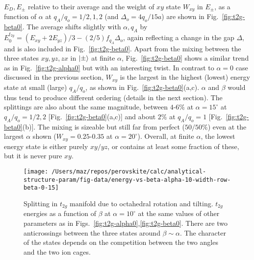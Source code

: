 \documentclass[a4paper,prb,twocolumn]{revtex4-1}  %
\begin{document}
$E_D, E_{\pm}$ relative to their average
and the weight of $xy$ state $W_{xy}$ in $E_{\pm}$,
as a function of $\alpha$ at $q_A/q_o=1/2,1,2$ (and $\Delta_o=4q_o/15a$)
are shown in Fig.~\ref{fig:t2g-beta0}.
The average shifts slightly with $\alpha,q_A$ by 
$E_0^{t_{2g}}= \left(E_{xy} + 2 E_{yz}\right)/3-(2/5)f_{q_A}\Delta_{o}$,
again reflecting 
a change in the gap $\Delta$,
and is also included in Fig.~\ref{fig:t2g-beta0}.
Apart from the mixing between the three states $xy,yz,zx$ in $\ket{\pm}$ at finite $\alpha$, 
Fig.~\ref{fig:t2g-beta0} shows a similar trend as in Fig.~\ref{fig:t2g-alpha0}
but with an interesting twist.
In contrast to $\alpha=0$ case discussed in the previous section,
$W_{xy}$ is the largest in the highest (lowest) energy state at small (large) $q_A/q_o$,
as shown in Fig.~\ref{fig:t2g-beta0}(a,c).
$\alpha$ and $\beta$ would thus tend to produce different ordering
(details in the next section).
The splittings are also about the same magnitude, between $4$-$6\%$ at $\alpha=15^\circ$
at $q_A/q_o=1/2,2$ [Fig.~\ref{fig:t2g-beta0}(a,c)] and about $2\%$ at $q_A/q_o=1$ [Fig.~\ref{fig:t2g-beta0}(b)].
The mixing is sizeable but still far from perfect ($50/50\%$) even at the largest $\alpha$ shown ($W_{xy}=0.25$-$0.35$ at $\alpha=20^\circ$).
Overall, at finite $\alpha$,
the lowest energy state is either purely $xy/yz$,
or contains at least some fraction of these,
but it is never pure $xy$.






\begin{figure}[htbp]
\begin{center}
\texttt{[image: /Users/maz/repos/perovskite/calc/analytical-structure-param/fig-data/energy-vs-beta-alpha-10-width-row-beta-0-15]}
\caption{
Splitting in $t_{2g}$ manifold due to octahedral rotation and tilting.
$t_{2g}$ energies as a function of $\beta$ at $\alpha=10^\circ$
at the same values of other parameters as in Figs.~\ref{fig:t2g-alpha0},\ref{fig:t2g-beta0}.
There are two anticrossings between the three states around $\beta\sim\alpha$.
The character of the states depends on 
the competition between the two angles and 
the two ion cages.
}
\label{fig:t2g-ge-Es}
\end{center}
\end{figure}
\end{document}
